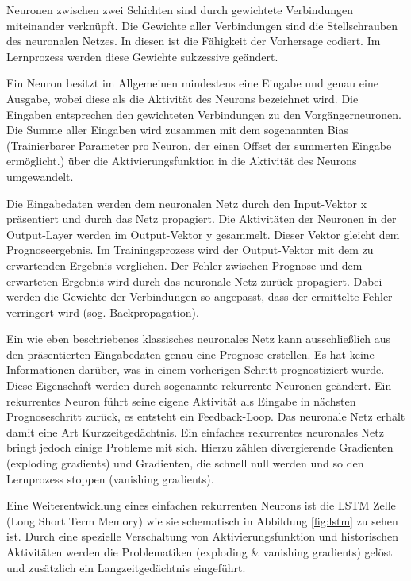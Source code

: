 \documentclass[
12pt, %
toc=listofnumbered, %
toc=chapterentrydotfill, %
numbers=noenddot, %
captions=tableheading, %
bibliography=numbered
]{scrreprt}
\newcommand{\qm}[1]{\glqq#1\grqq{}} %
\begin{document}
Neuronen zwischen zwei Schichten sind durch gewichtete Verbindungen miteinander verknüpft. Die Gewichte aller Verbindungen sind die \qm{Stellschrauben} des neuronalen Netzes. In diesen ist die Fähigkeit der Vorhersage codiert. Im Lernprozess werden diese Gewichte sukzessive geändert.

Ein Neuron besitzt im Allgemeinen mindestens eine Eingabe und genau eine Ausgabe, wobei diese als die Aktivität des Neurons bezeichnet wird. Die Eingaben entsprechen den gewichteten Verbindungen zu den Vorgängerneuronen. Die Summe aller Eingaben wird zusammen mit dem sogenannten Bias (Trainierbarer Parameter pro Neuron, der einen Offset der summerten Eingabe ermöglicht.) über die Aktivierungsfunktion in die Aktivität des Neurons umgewandelt. 

Die Eingabedaten werden dem neuronalen Netz durch den Input-Vektor $\mathrm{x}$ präsentiert und durch das Netz propagiert. Die Aktivitäten der Neuronen in der Output-Layer werden im Output-Vektor $\mathrm{y}$ gesammelt. Dieser Vektor gleicht dem Prognoseergebnis. Im Trainingsprozess wird der Output-Vektor mit dem zu erwartenden Ergebnis verglichen. Der Fehler zwischen Prognose und dem erwarteten Ergebnis wird durch das neuronale Netz zurück propagiert. Dabei werden die Gewichte der Verbindungen so angepasst, dass der ermittelte Fehler verringert wird (sog. Backpropagation). 

Ein wie eben beschriebenes klassisches neuronales Netz kann ausschließlich aus den präsentierten Eingabedaten genau eine Prognose erstellen. Es hat keine Informationen darüber, was in einem vorherigen Schritt prognostiziert wurde. Diese Eigenschaft werden durch sogenannte rekurrente Neuronen geändert. Ein rekurrentes Neuron führt seine eigene Aktivität als Eingabe in nächsten Prognoseschritt zurück, es entsteht ein \qm{Feedback-Loop}. Das neuronale Netz erhält damit eine Art Kurzzeitgedächtnis. Ein einfaches rekurrentes neuronales Netz bringt jedoch einige Probleme mit sich. Hierzu zählen divergierende Gradienten (exploding gradients) und Gradienten, die schnell null werden und so den Lernprozess stoppen (vanishing gradients). 

Eine Weiterentwicklung eines einfachen rekurrenten Neurons ist die LSTM Zelle (Long Short Term Memory) wie sie schematisch in Abbildung \ref{fig:lstm} zu sehen ist. Durch eine spezielle Verschaltung von Aktivierungsfunktion und historischen Aktivitäten werden die Problematiken (exploding \& vanishing gradients) gelöst und zusätzlich ein Langzeitgedächtnis eingeführt.
\end{document}
